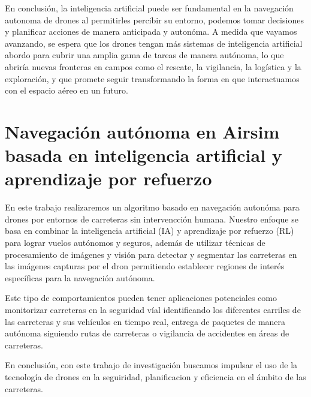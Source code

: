 En conclusión, la inteligencia artificial puede ser fundamental en la navegación autonoma de drones al permitirles percibir su entorno, podemos tomar decisiones y planificar acciones 
de manera anticipada y autonóma. A medida que vayamos avanzando, se espera que los drones tengan más sistemas de inteligencia artificial abordo para cubrir una amplia gama de tareas
de manera autónoma, lo que abriría nuevas fronteras en campos como el rescate, la vigilancia, la logística y la exploración, y que promete seguir transformando la forma en que 
interactuamos con el espacio aéreo en un futuro. 

\newpage
\section{Navegación autónoma en Airsim basada en inteligencia artificial y aprendizaje por refuerzo}
\label{sec:Navegación autónoma}

En este trabajo realizaremos un algoritmo basado en navegación autonóma para drones por entornos de carreteras sin intervencción humana. Nuestro enfoque se basa en 
combinar la inteligencia artificial (IA) y aprendizaje por refuerzo (RL) para lograr vuelos autónomos y seguros, además de utilizar técnicas de procesamiento de imágenes 
y visión para detectar y segmentar las carreteras en las imágenes capturas por el dron permitiendo establecer regiones de interés específicas para la navegación 
autónoma.\newline

Este tipo de comportamientos pueden tener aplicaciones potenciales como monitorizar carreteras en la seguridad víal identificando los diferentes carriles de las carreteras y sus vehículos
en tiempo real, entrega de paquetes de manera autónoma siguiendo rutas de carreteras o vigilancia de accidentes en áreas de carreteras. \newline

En conclusión, con este trabajo de investigación buscamos impulsar el uso de la tecnología de drones en la seguiridad, planificacion y eficiencia en el ámbito de las carreteras. 


